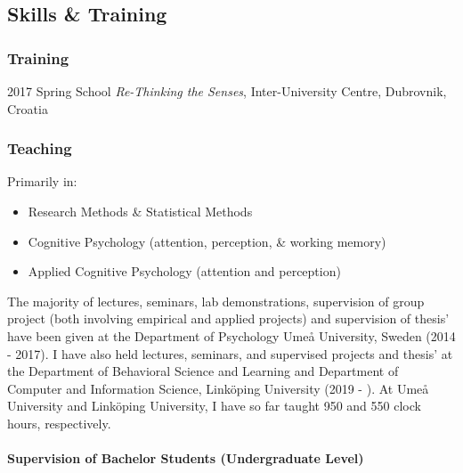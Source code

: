 \documentclass[]{article}
\providecommand{\tightlist}{%
  \setlength{\itemsep}{0pt}\setlength{\parskip}{0pt}}
\begin{document}
\hypertarget{skills-training}{%
\subsection{Skills \& Training}\label{skills-training}}

\hypertarget{training}{%
\subsubsection{Training}\label{training}}

2017 Spring School \emph{Re-Thinking the Senses}, Inter-University
Centre, Dubrovnik, Croatia

\hypertarget{teaching}{%
\subsubsection{Teaching}\label{teaching}}

Primarily in:

\begin{itemize}
\tightlist
\item
  Research Methods \& Statistical Methods
\item
  Cognitive Psychology (attention, perception, \& working memory)
\item
  Applied Cognitive Psychology (attention and perception)
\end{itemize}

The majority of lectures, seminars, lab demonstrations, supervision of
group project (both involving empirical and applied projects) and
supervision of thesis' have been given at the Department of Psychology
Umeå University, Sweden (2014 - 2017). I have also held lectures,
seminars, and supervised projects and thesis' at the Department of
Behavioral Science and Learning and Department of Computer and
Information Science, Linköping University (2019 - ). At Umeå University
and Linköping University, I have so far taught 950 and 550 clock hours,
respectively.

\hypertarget{supervision-of-bachelor-students-undergraduate-level}{%
\paragraph{Supervision of Bachelor Students (Undergraduate
Level)}\label{supervision-of-bachelor-students-undergraduate-level}}
\end{document}
